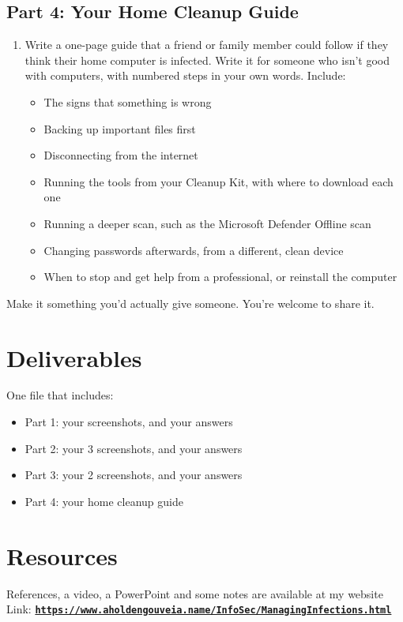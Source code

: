 \documentclass[12pt]{article}
\begin{document}
\subsection*{Part 4: Your Home Cleanup Guide}
\begin{enumerate}[start=14]
    \item Write a one-page guide that a friend or family member could follow if they think their home computer is infected. Write it for someone who isn't good with computers, with numbered steps in your own words. Include:
    \begin{itemize}
        \item The signs that something is wrong
        \item Backing up important files first
        \item Disconnecting from the internet
        \item Running the tools from your Cleanup Kit, with where to download each one
        \item Running a deeper scan, such as the Microsoft Defender Offline scan
        \item Changing passwords afterwards, from a different, clean device
        \item When to stop and get help from a professional, or reinstall the computer
    \end{itemize}
\end{enumerate}
Make it something you'd actually give someone. You're welcome to share it.

\section*{Deliverables}
One file that includes:
\begin{itemize}
    \item Part 1: your screenshots, and your answers
    \item Part 2: your 3 screenshots, and your answers
    \item Part 3: your 2 screenshots, and your answers
    \item Part 4: your home cleanup guide
\end{itemize}

\section*{Resources}
References, a video, a PowerPoint and some notes are available at my website
Link: \href{https://www.aholdengouveia.name/InfoSec/ManagingInfections.html}{\textbf{\nolinkurl{https://www.aholdengouveia.name/InfoSec/ManagingInfections.html}}}
\end{document}
